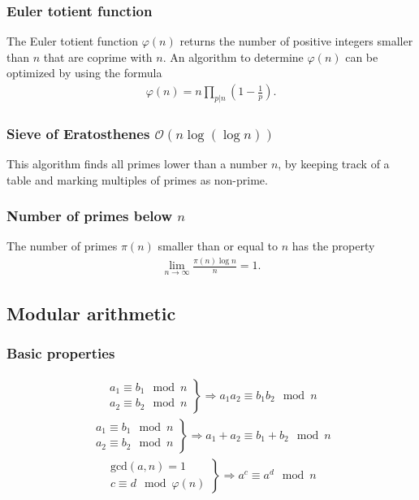 \subsubsection{Euler totient function}
The Euler totient function $\varphi(n)$ returns the number of positive integers smaller than $n$ that are coprime with $n$. An algorithm to determine $\varphi(n)$ can be optimized by using the formula 
\begin{align*}
    \varphi(n) = n \prod_{p|n} \left(1 - \frac1p\right).
\end{align*}

\subsubsection{Sieve of Eratosthenes $\mathcal O(n\log(\log n))$}
This algorithm finds all primes lower than a number $n$, by keeping track of a table and marking multiples of primes as non-prime.

\subsubsection{Number of primes below $n$}
The number of primes $\pi(n)$ smaller than or equal to $n$ has the property
\begin{align*}
    \lim_{n \to \infty} \frac{\pi(n)\log n }{n} = 1.
\end{align*}



\subsection{Modular arithmetic}

\subsubsection{Basic properties}
\begin{align*}
    \left.\begin{array}{r}
        a_1 \equiv b_1 \mod n \\
        a_2 \equiv b_2 \mod n
    \end{array}\right\}
    \Rightarrow a_1a_2 \equiv b_1b_2 \mod n
\end{align*}
\begin{align*}
    \left.\begin{array}{r}
        a_1 \equiv b_1 \mod n \\
        a_2 \equiv b_2 \mod n
    \end{array}\right\}
    \Rightarrow a_1 + a_2 \equiv b_1 + b_2 \mod n
\end{align*}
\begin{align*}
    \left.\begin{array}{r}
        \text{gcd}(a, n) = 1 \\
        c \equiv d \mod \varphi(n)
    \end{array}\right\}
    \Rightarrow a^c \equiv a^d \mod n
\end{align*}


